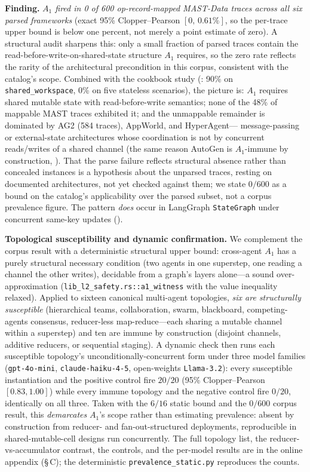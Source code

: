 \documentclass[journal,compsoc,10pt]{IEEEtran}
\theoremstyle{definition}
\theoremstyle{remark}
\begin{document}
\medskip
\noindent\textbf{Finding.}
\emph{$A_1$ fired in 0 of 600 op-record-mapped MAST-Data traces across all
six parsed frameworks} (exact 95\% Clopper--Pearson $[0,\,0.61\%]$, so the
per-trace upper bound is below one percent, not merely a point estimate of
zero). A structural audit sharpens this: only a small fraction of parsed
traces contain the read-before-write-on-shared-state structure $A_1$
requires, so the zero rate reflects the rarity of the architectural
precondition in this corpus, consistent with the catalog's scope. Combined
with the cookbook study (: 90\% on
\texttt{shared\_workspace}, 0\% on five stateless scenarios), the picture
is: $A_1$ requires shared mutable state with read-before-write semantics;
none of the 48\% of mappable MAST traces exhibited it; and the unmappable
remainder is dominated by AG2 (584 traces), AppWorld, and HyperAgent---%
message-passing or external-state architectures whose coordination is not
by concurrent reads/writes of a shared channel (the same reason AutoGen is
$A_1$-immune by construction, ). That
the parse failure reflects structural absence rather than concealed
instances is a hypothesis about the unparsed traces, resting on documented
architectures, not yet checked against them; we state $0/600$ as a bound on
the catalog's applicability over the parsed subset, not a corpus prevalence
figure. The pattern \emph{does} occur in LangGraph \texttt{StateGraph}
under concurrent same-key updates ().

\medskip
\noindent\textbf{Topological susceptibility and dynamic confirmation.}
We complement the corpus result with a deterministic structural upper
bound: cross-agent $A_1$ has a purely structural necessary condition (two
agents in one superstep, one reading a channel the other writes), decidable
from a graph's layers alone---a sound over-approximation
(\texttt{lib\_l2\_safety.rs::a1\_witness} with the value inequality
relaxed). Applied to sixteen canonical multi-agent topologies, \emph{six
are structurally susceptible} (hierarchical teams, collaboration, swarm,
blackboard, competing-agents consensus, reducer-less map-reduce---each
sharing a mutable channel within a superstep) and ten are immune by
construction (disjoint channels, additive reducers, or sequential staging).
A dynamic check then runs each susceptible topology's
unconditionally-concurrent form under three model families
(\texttt{gpt-4o-mini}, \texttt{claude-haiku-4-5}, open-weights
\texttt{Llama-3.2}): every susceptible instantiation and the positive
control fire $20/20$ (95\% Clopper--Pearson $[0.83,1.00]$) while every
immune topology and the negative control fire $0/20$, identically on all
three. Taken with the $6/16$ static bound and the $0/600$ corpus result,
this \emph{demarcates} $A_1$'s scope rather than estimating prevalence:
absent by construction from reducer- and fan-out-structured deployments,
reproducible in shared-mutable-cell designs run concurrently. The full
topology list, the reducer-vs-accumulator contrast, the controls, and the
per-model results are in the online appendix (\S\,C); the deterministic
\texttt{prevalence\_static.py} reproduces the counts.
\end{document}
